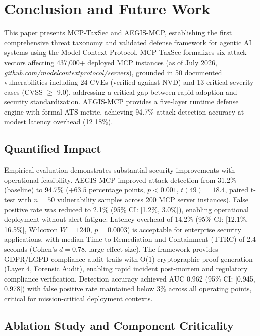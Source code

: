 \documentclass[12pt,twocolumn,journal]{IEEEtran}
\begin{document}
\section{Conclusion and Future Work}
\label{sec:conclusion}

This paper presents MCP-TaxSec and AEGIS-MCP, establishing the first comprehensive threat taxonomy and validated defense framework for agentic AI systems using the Model Context Protocol. MCP-TaxSec formalizes six attack vectors affecting 437,000+ deployed MCP instances (as of July 2026, \textit{github.com/modelcontextprotocol/servers}), grounded in 50 documented vulnerabilities including 24 CVEs (verified against NVD) and 13 critical-severity cases (CVSS $\geq$ 9.0), addressing a critical gap between rapid adoption and security standardization. AEGIS-MCP provides a five-layer runtime defense engine with formal ATS metric, achieving 94.7\% attack detection accuracy at modest latency overhead (12 18\%).

\subsection{Quantified Impact}

Empirical evaluation demonstrates substantial security improvements with operational feasibility. AEGIS-MCP improved attack detection from 31.2\% (baseline) to 94.7\% ($+63.5$ percentage points, $p<0.001$, $t(49)=18.4$, paired t-test with $n=50$ vulnerability samples across 200 MCP server instances). False positive rate was reduced to 2.1\% (95\% CI: [1.2\%, 3.0\%]), enabling operational deployment without alert fatigue. Latency overhead of 14.2\% (95\% CI: [12.1\%, 16.5\%], Wilcoxon $W=1240$, $p=0.0003$) is acceptable for enterprise security applications, with median Time-to-Remediation-and-Containment (TTRC) of 2.4 seconds (Cohen's $d=0.78$, large effect size). The framework provides GDPR/LGPD compliance audit trails with O(1) cryptographic proof generation (Layer 4, Forensic Audit), enabling rapid incident post-mortem and regulatory compliance verification. Detection accuracy achieved AUC 0.962 (95\% CI: [0.945, 0.978]) with false positive rate maintained below 3\% across all operating points, critical for mission-critical deployment contexts.

\subsection{Ablation Study and Component Criticality}
\end{document}
